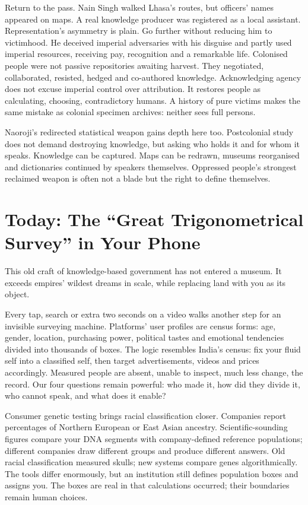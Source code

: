 Return to the pass. Nain Singh walked Lhasa's routes, but officers' names appeared on maps. A real knowledge producer was registered as a local assistant. Representation's asymmetry is plain. Go further without reducing him to victimhood. He deceived imperial adversaries with his disguise and partly used imperial resources, receiving pay, recognition and a remarkable life. Colonised people were not passive repositories awaiting harvest. They negotiated, collaborated, resisted, hedged and co-authored knowledge. Acknowledging agency does not excuse imperial control over attribution. It restores people as calculating, choosing, contradictory humans. A history of pure victims makes the same mistake as colonial specimen archives: neither sees full persons.

Naoroji's redirected statistical weapon gains depth here too. Postcolonial study does not demand destroying knowledge, but asking who holds it and for whom it speaks. Knowledge can be captured. Maps can be redrawn, museums reorganised and dictionaries continued by speakers themselves. Oppressed people's strongest reclaimed weapon is often not a blade but the right to define themselves.

\section[The Survey in Your Phone]{Today: The ``Great Trigonometrical Survey'' in Your Phone}
This old craft of knowledge-based government has not entered a museum. It exceeds empires' wildest dreams in scale, while replacing land with you as its object.

Every tap, search or extra two seconds on a video walks another step for an invisible surveying machine. Platforms' user profiles are census forms: age, gender, location, purchasing power, political tastes and emotional tendencies divided into thousands of boxes. The logic resembles India's census: fix your fluid self into a classified self, then target advertisements, videos and prices accordingly. Measured people are absent, unable to inspect, much less change, the record. Our four questions remain powerful: who made it, how did they divide it, who cannot speak, and what does it enable?

Consumer genetic testing brings racial classification closer. Companies report percentages of Northern European or East Asian ancestry. Scientific-sounding figures compare your DNA segments with company-defined reference populations; different companies draw different groups and produce different answers. Old racial classification measured skulls; new systems compare genes algorithmically. The tools differ enormously, but an institution still defines population boxes and assigns you. The boxes are real in that calculations occurred; their boundaries remain human choices.

